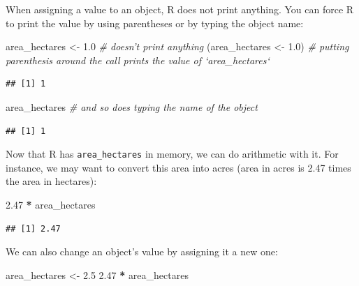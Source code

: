 \documentclass[]{book}
\newenvironment{Shaded}{\begin{snugshade}}{\end{snugshade}}
\newcommand{\FloatTok}[1]{\textcolor[rgb]{0.00,0.00,0.81}{#1}}
\newcommand{\StringTok}[1]{\textcolor[rgb]{0.31,0.60,0.02}{#1}}
\newcommand{\CommentTok}[1]{\textcolor[rgb]{0.56,0.35,0.01}{\textit{#1}}}
\newcommand{\OperatorTok}[1]{\textcolor[rgb]{0.81,0.36,0.00}{\textbf{#1}}}
\newcommand{\NormalTok}[1]{#1}
\begin{document}
When assigning a value to an object, R does not print anything. You can
force R to print the value by using parentheses or by typing the object
name:

\begin{Shaded}
\begin{Highlighting}[]
\NormalTok{area_hectares <-}\StringTok{ }\FloatTok{1.0}    \CommentTok{# doesn't print anything}
\NormalTok{(area_hectares <-}\StringTok{ }\FloatTok{1.0}\NormalTok{)  }\CommentTok{# putting parenthesis around the call prints the value of `area_hectares`}
\end{Highlighting}
\end{Shaded}

\begin{verbatim}
## [1] 1
\end{verbatim}

\begin{Shaded}
\begin{Highlighting}[]
\NormalTok{area_hectares         }\CommentTok{# and so does typing the name of the object}
\end{Highlighting}
\end{Shaded}

\begin{verbatim}
## [1] 1
\end{verbatim}

Now that R has \texttt{area\_hectares} in memory, we can do arithmetic
with it. For instance, we may want to convert this area into acres (area
in acres is 2.47 times the area in hectares):

\begin{Shaded}
\begin{Highlighting}[]
\FloatTok{2.47} \OperatorTok{*}\StringTok{ }\NormalTok{area_hectares}
\end{Highlighting}
\end{Shaded}

\begin{verbatim}
## [1] 2.47
\end{verbatim}

We can also change an object's value by assigning it a new one:

\begin{Shaded}
\begin{Highlighting}[]
\NormalTok{area_hectares <-}\StringTok{ }\FloatTok{2.5}
\FloatTok{2.47} \OperatorTok{*}\StringTok{ }\NormalTok{area_hectares}
\end{Highlighting}
\end{Shaded}
\end{document}
